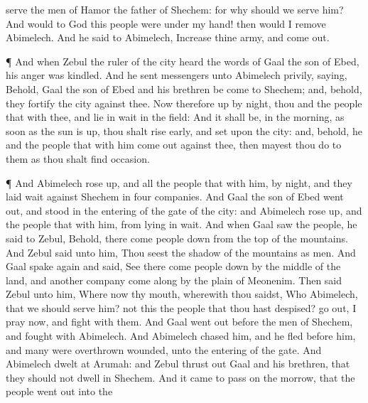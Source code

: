 {serve the
men of
Hamor the
father of
Shechem: for why should we
serve him?
And would to God this
people were
under my
hand! then would I
remove
Abimelech. And he
said to
Abimelech,
Increase thine
army, and come
out.
\par }{\PP {}¶ And when
Zebul the
ruler of the
city
heard the
words of
Gaal the
son of
Ebed, his
anger was
kindled.
And he
sent
messengers unto
Abimelech
privily,
saying, Behold,
Gaal the
son of
Ebed and his
brethren be
come to
Shechem; and, behold, they
fortify the
city against thee.
Now therefore
up by
night, thou and the
people that
{} with thee, and lie in
wait in the
field:
And it shall be,
{} in the
morning, as soon as the
sun is
up, thou shalt rise
early, and
set upon the
city: and, behold,
{} he and the
people that
{} with him come
out against thee, then mayest thou
do to them as
thou shalt find
occasion.
\par }{\PP {}¶ And
Abimelech rose
up, and all the
people that
{} with him, by
night, and they laid
wait against
Shechem in
four
companies.
And
Gaal the
son of
Ebed went
out, and
stood in the
entering of the
gate of the
city: and
Abimelech rose
up, and the
people that
{} with him, from lying in
wait.
And when
Gaal
saw the
people, he
said to
Zebul, Behold, there
come
people
down from the
top of the
mountains. And
Zebul
said unto him, Thou
seest the
shadow of the
mountains as
{}
men.
And
Gaal
spake
again and
said, See there
come
people
down by the
middle of the
land, and
another
company
come along by the
plain
of
Meonenim.
Then
said
Zebul unto him, Where
{}
now thy
mouth, wherewith thou
saidst, Who
{}
Abimelech, that we should
serve him?
{} not this the
people that thou hast
despised? go
out, I pray
now, and
fight with them.
And
Gaal went
out
before the
men of
Shechem, and
fought with
Abimelech.
And
Abimelech
chased him, and he
fled
before him, and
many were
overthrown
{}
wounded,
{} unto the
entering of the
gate.
And
Abimelech
dwelt at
Arumah: and
Zebul thrust
out
Gaal and his
brethren, that they should not
dwell in
Shechem.
And it came to pass on the
morrow, that the
people went
out into the
}
